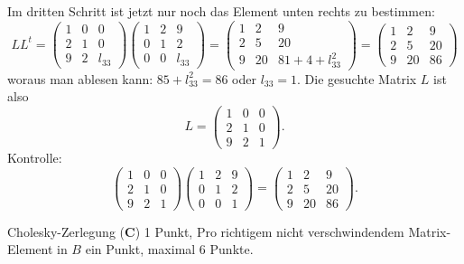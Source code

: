 \begin{loesung}
Im dritten Schritt ist jetzt nur noch das Element unten rechts zu bestimmen:
\[
LL^t=
\begin{pmatrix}
1&0&     0\\
2&1&     0\\
9&2&l_{33}
\end{pmatrix}
\begin{pmatrix}
1&2&     9\\
0&1&     2\\
0&0&l_{33}
\end{pmatrix}
=
\begin{pmatrix}
1& 2& 9\\
2& 5&20\\
9&20&81+4+l_{33}^2
\end{pmatrix}
=
\begin{pmatrix}
1& 2& 9\\
2& 5&20\\
9&20&86
\end{pmatrix}
\]
woraus man ablesen kann: $85+l_{33}^2=86$ oder $l_{33}=1$. Die gesuchte
Matrix $L$ ist also
\[
L=
\begin{pmatrix}
1&0&0\\
2&1&0\\
9&2&1
\end{pmatrix}.
\]
Kontrolle:
\[
\begin{pmatrix}
1&0&0\\
2&1&0\\
9&2&1
\end{pmatrix}
\begin{pmatrix}
1&2&9\\
0&1&2\\
0&0&1
\end{pmatrix}
=
\begin{pmatrix}
1& 2& 9\\
2& 5&20\\
9&20&86
\end{pmatrix}.
\]
\end{loesung}

\begin{bewertung}
Cholesky-Zerlegung ({\bf C}) 1 Punkt,
Pro richtigem nicht verschwindendem Matrix-Element in $B$ ein Punkt,
maximal 6 Punkte.
\end{bewertung}
